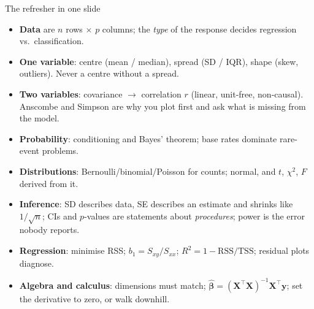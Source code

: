 \documentclass[aspectratio=169,11pt]{beamer}
\begin{document}
\begin{frame}{The refresher in one slide}
  \footnotesize
  \begin{itemize}
    \item \textbf{Data} are $n$ rows $\times$ $p$ columns; the \emph{type} of
          the response decides regression vs.\ classification.
    \item \textbf{One variable}: centre (mean / median), spread (SD / IQR),
          shape (skew, outliers). Never a centre without a spread.
    \item \textbf{Two variables}: covariance $\to$ correlation $r$ (linear,
          unit-free, non-causal). Anscombe and Simpson are why you plot first
          and ask what is missing from the model.
    \item \textbf{Probability}: conditioning and Bayes' theorem; base rates
          dominate rare-event problems.
    \item \textbf{Distributions}: Bernoulli/binomial/Poisson for counts;
          normal, and $t$, $\chi^2$, $F$ derived from it.
    \item \textbf{Inference}: SD describes data, SE describes an estimate and
          shrinks like $1/\sqrt n$; CIs and $p$-values are statements about
          \emph{procedures}; power is the error nobody reports.
    \item \textbf{Regression}: minimise RSS; $b_1 = S_{xy}/S_{xx}$;
          $R^2 = 1 - \mathrm{RSS}/\mathrm{TSS}$; residual plots diagnose.
    \item \textbf{Algebra and calculus}: dimensions must match;
          $\hat{\boldsymbol\beta} = (\mathbf{X}^\top\mathbf{X})^{-1}\mathbf{X}^\top\mathbf{y}$;
          set the derivative to zero, or walk downhill.
  \end{itemize}
\end{frame}
\end{document}
